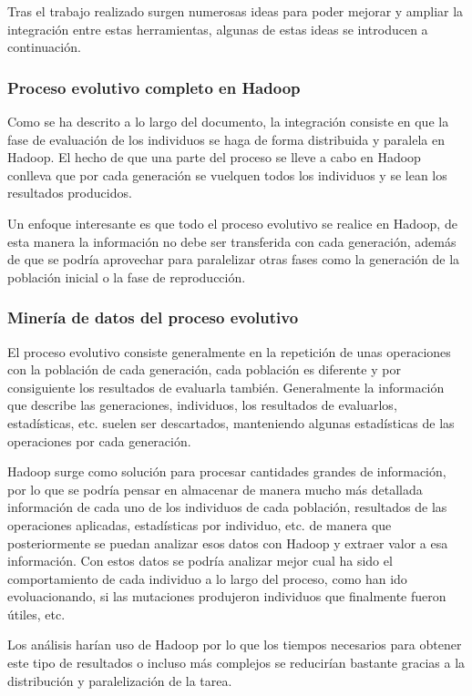Tras el trabajo realizado surgen numerosas ideas para poder mejorar y ampliar la integraci\'on entre estas herramientas, algunas de estas ideas se introducen a continuaci\'on.

\subsubsection{Proceso evolutivo completo en Hadoop}

Como se ha descrito a lo largo del documento, la integraci\'on consiste en que la fase de evaluaci\'on de los individuos se haga de forma distribuida y paralela en Hadoop. El hecho de que una parte del proceso se lleve a cabo en Hadoop conlleva que por cada generaci\'on se vuelquen todos los individuos y se lean los resultados producidos. 

Un enfoque interesante es que todo el proceso evolutivo se realice en Hadoop, de esta manera la informaci\'on no debe ser transferida con cada generaci\'on, adem\'as de que se podr\'ia aprovechar para paralelizar otras fases como la generaci\'on de la poblaci\'on inicial o la fase de reproducci\'on.

\subsubsection{Miner\'ia de datos del proceso evolutivo}

El proceso evolutivo consiste generalmente en la repetici\'on de unas operaciones con la poblaci\'on de cada generaci\'on, cada poblaci\'on es diferente y por consiguiente los resultados de evaluarla tambi\'en. Generalmente la informaci\'on que describe las generaciones, individuos, los resultados de evaluarlos, estad\'isticas, etc. suelen ser descartados, manteniendo algunas estad\'isticas de las operaciones por cada generaci\'on.

Hadoop surge como soluci\'on para procesar cantidades grandes de informaci\'on, por lo que se podr\'ia pensar en almacenar de manera mucho m\'as detallada informaci\'on de cada uno de los individuos de cada poblaci\'on, resultados de las operaciones aplicadas, estad\'isticas por individuo, etc. de manera que posteriormente se puedan analizar esos datos con Hadoop y extraer valor a esa informaci\'on. Con estos datos se podr\'ia analizar mejor cual ha sido el comportamiento de cada individuo a lo largo del proceso, como han ido evoluacionando, si las mutaciones produjeron individuos que finalmente fueron \'utiles, etc.

Los an\'alisis har\'ian uso de Hadoop por lo que los tiempos necesarios para obtener este tipo de resultados o incluso m\'as complejos se reducir\'ian bastante gracias a la distribuci\'on y paralelizaci\'on de la tarea.

